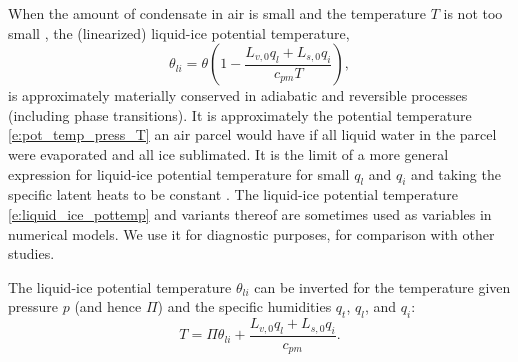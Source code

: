 \documentclass{report}
\begin{document}
When the amount of condensate in air is small and the temperature $T$ is not too small \citep[e.g.,][]{Tripoli81}, the (linearized) liquid-ice potential temperature,
\begin{equation}\label{e:liquid_ice_pottemp}
\theta_{li} = \theta \left( 1 - \frac{L_{v,0} q_l + L_{s, 0} q_i}{c_{pm} T} \right),
\end{equation}
is approximately materially conserved in adiabatic and reversible processes (including phase transitions). It is approximately the potential temperature \eqref{e:pot_temp_press_T} an air parcel would have if all liquid water in the parcel were evaporated and all ice sublimated. It is the limit of a more general expression for liquid-ice potential temperature for small $q_l$ and $q_i$ and taking the specific latent heats to be constant \citep[e.g.,][]{Bryan04a}. The liquid-ice potential temperature \eqref{e:liquid_ice_pottemp} and variants thereof are sometimes used as variables in numerical models. We use it for diagnostic purposes, for comparison with other studies.

The liquid-ice potential temperature $\theta_{li}$ can be inverted for the temperature given pressure $p$ (and hence $\Pi$) and the specific humidities $q_t$, $q_l$, and $q_i$:
\begin{equation}\label{e:temp_from_theta_li_given_p}
    T = \Pi \theta_{li} + \frac{L_{v, 0} q_l + L_{s, 0} q_i}{c_{pm}}.
\end{equation}
\end{document}

